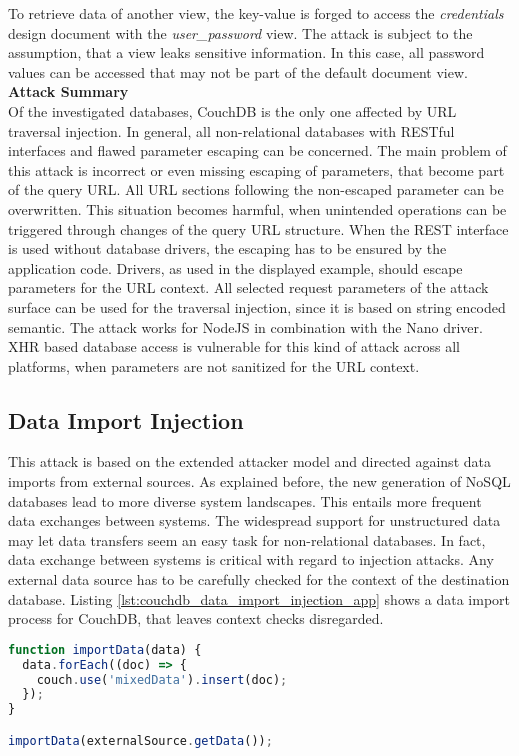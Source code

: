 To retrieve data of another view, the key-value is forged to access the \emph{credentials} design document with the \emph{user\_password} view. The attack is subject to the assumption, that a view leaks sensitive information. In this case, all password values can be accessed that may not be part of the default document view. \\

\textbf{Attack Summary} \\
Of the investigated databases, CouchDB is the only one affected by URL traversal injection. In general, all non-relational databases with RESTful interfaces and flawed parameter escaping can be concerned. The main problem of this attack is incorrect or even missing escaping of parameters, that become part of the query URL. All URL sections following the non-escaped parameter can be overwritten. This situation becomes harmful, when unintended operations can be triggered through changes of the query URL structure. When the REST interface is used without database drivers, the escaping has to be ensured by the application code. Drivers, as used in the displayed example, should escape parameters for the URL context. All selected request parameters of the attack surface can be used for the traversal injection, since it is based on string encoded semantic. The attack works for NodeJS in combination with the Nano driver. XHR based database access is vulnerable for this kind of attack across all platforms, when parameters are not sanitized for the URL context. 

\subsection{Data Import Injection}
This attack is based on the extended attacker model and directed against data imports from external sources. As explained before, the new generation of NoSQL databases lead to more diverse system landscapes. This entails more frequent data exchanges between systems. The widespread support for unstructured data may let data transfers seem an easy task for non-relational databases. In fact, data exchange between systems is critical with regard to injection attacks. Any external data source has to be carefully checked for the context of the destination database. Listing \ref{lst:couchdb_data_import_injection_app} shows a data import process for CouchDB, that leaves context checks disregarded.\\

\begin{lstlisting}[caption={Vulnerable NodeJS example for data import injection against CouchDB}, label={lst:couchdb_data_import_injection_app}, language=JavaScript]
function importData(data) {
  data.forEach((doc) => {
    couch.use('mixedData').insert(doc);
  });
}

importData(externalSource.getData());
\end{lstlisting}

